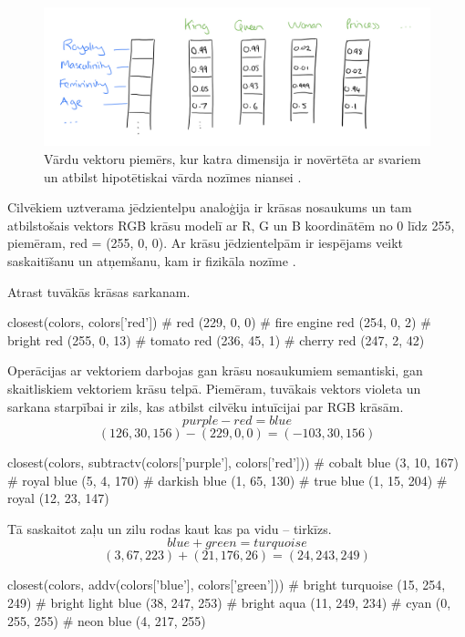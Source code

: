 \begin{figure}[h]
	\centering
	\includegraphics[width=\textwidth]{figures/word2vec-distributed-representation.png}
	\caption{Vārdu vektoru piemērs, kur katra dimensija ir novērtēta ar svariem un atbilst hipotētiskai vārda nozīmes niansei \cite{colyer2016}.}
	\label{fig:distributed-representation}
\end{figure}

Cilvēkiem uztverama jēdzientelpu analoģija ir krāsas nosaukums un tam atbilstošais vektors RGB krāsu modelī ar R, G un B koordinātēm no 0 līdz 255, piemēram, red = (255, 0, 0). Ar krāsu jēdzientelpām ir iespējams veikt saskaitīšanu un atņemšanu, kam ir fizikāla nozīme \cite{parrish2017}.

Atrast tuvākās krāsas sarkanam.
\begin{python}
closest(colors, colors['red'])
# red (229, 0, 0)
# fire engine red (254, 0, 2)
# bright red (255, 0, 13)
# tomato red (236, 45, 1)
# cherry red (247, 2, 42)
\end{python}

Operācijas ar vektoriem darbojas gan krāsu nosaukumiem semantiski, gan skaitliskiem vektoriem krāsu telpā. Piemēram, tuvākais vektors violeta un sarkana starpībai ir zils, kas atbilst cilvēku intuīcijai par RGB krāsām.
$$purple - red = blue$$
$$(126, 30, 156) - (229, 0, 0) = (-103, 30, 156)$$
\begin{python}
closest(colors, subtractv(colors['purple'], colors['red']))
# cobalt blue (3, 10, 167)
# royal blue (5, 4, 170)
# darkish blue (1, 65, 130)
# true blue (1, 15, 204)
# royal (12, 23, 147)
\end{python}

Tā saskaitot zaļu un zilu rodas kaut kas pa vidu -- tirkīzs.
$$blue + green = turquoise$$
$$(3, 67, 223) + (21, 176, 26) = (24, 243, 249)$$
\begin{python}
closest(colors, addv(colors['blue'], colors['green']))
# bright turquoise (15, 254, 249)
# bright light blue (38, 247, 253)
# bright aqua (11, 249, 234)
# cyan (0, 255, 255)
# neon blue (4, 217, 255)
\end{python}

